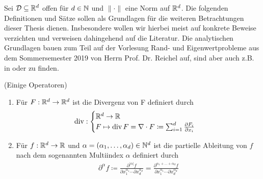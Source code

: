 Sei $\mathcal{D} \subseteq \mathbb{R}^d$ offen für $d\in \mathbb{N}$ und $\lVert \cdot \rVert$ eine Norm auf $\mathbb{R}^d$.
Die folgenden Definitionen und Sätze sollen als Grundlagen für die weiteren Betrachtungen dieser Thesis dienen. Insbesondere wollen wir hierbei meist auf konkrete Beweise verzichten und verweisen dahingehend auf die Literatur. 
Die analytischen Grundlagen bauen zum Teil auf der Vorlesung Rand- und Eigenwertprobleme aus dem Sommersemester 2019 von Herrn Prof. Dr. Reichel auf, sind aber auch  z.B. in \cite{dobrowolski2010angewandte} oder \cite{evans10} zu finden.
\begin{Definition}(Einige Operatoren)
	\begin{enumerate}[label=(\alph*)]
		\item Für $F: \mathbb{R}^d \to \mathbb{R}^d$ ist die Divergenz von F definiert durch
			\begin{align*}
				\operatorname{div}  : \begin{cases}
				\mathbb{R}^d  \to \mathbb{R} \\
				F \mapsto \operatorname{div} F= \nabla \cdot  F \coloneqq \sum_{i=1}^{d} \frac{\partial F_i}{ \partial x_i}
				\end{cases}
			\end{align*}
		\item Für $f: \mathbb{R}^d \to \mathbb{R}$ und $\alpha = (\alpha_1,\dots,\alpha_d) \in \mathbb{N}^d$ ist die partielle Ableitung von $f$ nach dem sogenannten Multiindex $\alpha$ definiert durch
			\begin{align*}
				\partial^{\alpha}f \coloneqq 
				\frac{\partial^{|\alpha|} f}{\partial x_1 ^{\alpha_1} \cdots  \partial x_d^{\alpha_d} } 
				=\frac{\partial^{\alpha_1+\dots +\alpha_d} f}{\partial x_1 ^{\alpha_1} \cdots  \partial x_d^{\alpha_d} } 
			\end{align*}
	\end{enumerate}
\end{Definition}



